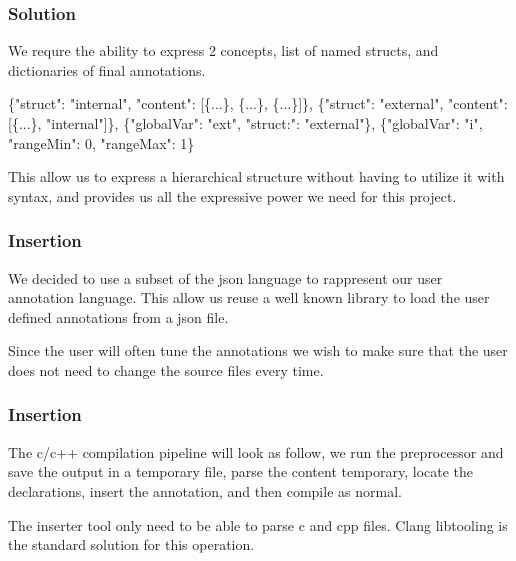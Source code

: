 \documentclass{beamer}
\begin{document}
\begin{frame}[fragile]
	\frametitle{Solution}
	\begin{block}{}
		We requre the ability to express 2 concepts, list of named structs, and dictionaries of final annotations.
	\end{block}

	\begin{alertblock}{}
	\begin{semiverbatim}	
		\{\quad "struct": "internal",
		\quad "content": [\{...\}, \{...\}, \{...\}]\},
		\{\quad "struct": "external",
		\quad "content": [\{...\}, "internal"]\},
		\{\quad "globalVar":  "ext", "struct:": "external"\},
		\{\quad "globalVar":  "i", "rangeMin": 0, "rangeMax": 1\}
	\end{semiverbatim}
	\end{alertblock}

	\begin{block}{}
	This allow us to express a hierarchical structure without having to utilize it with syntax, and provides us all the expressive power we need for this project.
	\end{block}

\end{frame}
\begin{frame}[fragile]
	\frametitle{Insertion}
	\begin{block}{}
	We decided to use a subset of the json language to rappresent our user annotation language.
	This allow us reuse a well known library to load the user defined annotations from a json file.
	\end{block}
	\begin{block}{}
		Since the user will often tune the annotations we wish to make sure that the user does not need to change the source files every time. 
	\end{block}

\end{frame}
\begin{frame}[fragile]
	\frametitle{Insertion}
	\begin{block}{}
		The c/c++ compilation pipeline will look as follow, we run the preprocessor and save the output in a temporary file, parse the content temporary, locate the declarations, insert the annotation, and then compile as normal. 
	\end{block}
	
	\begin{block}{}
		The inserter tool only need to be able to parse c and cpp files. Clang libtooling is the standard solution for this operation.
	\end{block}

\end{frame}
\end{document}
